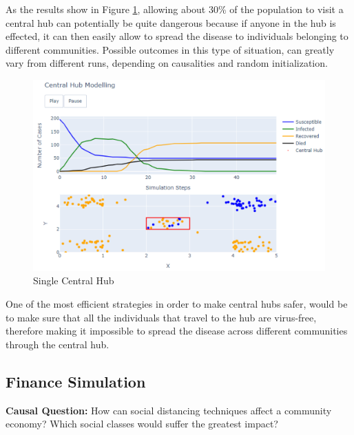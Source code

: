 As the results show in Figure \ref{hub}, allowing about 30\% of the population to visit a central hub can potentially be quite dangerous because if anyone in the hub is effected, it can then easily allow to spread the disease to individuals belonging to different communities. Possible outcomes in this type of situation, can greatly vary from different runs, depending on causalities and random initialization.

\begin{figure}[ht!]%
    \centering
    \includegraphics[width=0.85\linewidth]{latex/images/hubs1.pdf}
    \caption{Single Central Hub}
    \label{hub}
\end{figure}

One of the most efficient strategies in order to make central hubs safer, would be to make sure that all the individuals that travel to the hub are virus-free, therefore making it impossible to spread the disease across different communities through the central hub.

\subsection{Finance Simulation}

\textbf{Causal Question:} How can social distancing techniques affect a community economy? Which social classes would suffer the greatest impact?

